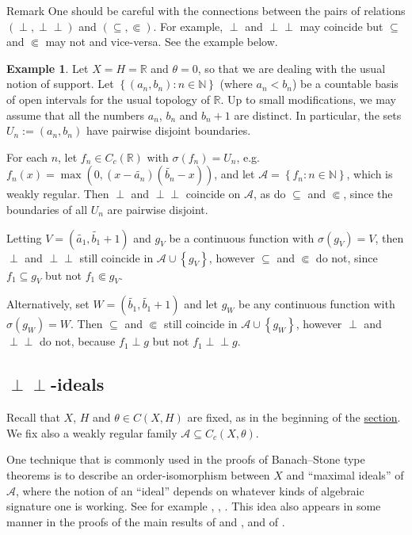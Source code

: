 \documentclass[letter,11pt]{amsart}
\theoremstyle{plain}		\newtheorem{theorem}[generalnumbering]{Theorem}
\theoremstyle{plain}		\newtheorem{corollary}[generalnumbering]{Corollary}
\theoremstyle{definition}		\newtheorem{definition}[generalnumbering]{Definition}
\theoremstyle{definition}		\newtheorem{example}[generalnumbering]{Example}
\theoremstyle{plain}		\newtheorem{proposition}[generalnumbering]{Proposition}
\theoremstyle{plain}		\newtheorem{lemma}[generalnumbering]{Lemma}
\theoremstyle{plain}    \newtheorem{plainstyle}[generalnumbering]{\namefordifferentenvironment}
\theoremstyle{plain}    \newtheorem*{plainstyle*}{\namefordifferentenvironment}
\theoremstyle{definition}    \newtheorem{definitionstyle}[generalnumbering]{\namefordifferentenvironment}
\theoremstyle{definition}    \newtheorem*{definitionstyle*}{\namefordifferentenvironment}
\newcommand{\namefordifferentenvironment}{}
\newenvironment{denv*}[1]{\renewcommand{\namefordifferentenvironment}{#1}\begin{definitionstyle*}}{\end{definitionstyle*}}
\newcommand{\perpp}{\perp\!\!\!\perp}
\begin{document}
\begin{denv*}{Remark}
	One should be careful with the connections between the pairs of relations $(\perp,\perpp)$ and $(\subseteq,\Subset)$. For example, $\perp$ and $\perpp$ may coincide but $\subseteq$ and $\Subset$ may not and vice-versa. See the example below.
\end{denv*}

\begin{example}
	Let $X=H=\mathbb{R}$ and $\theta=0$, so that we are dealing with the usual notion of support. Let $\left\{(a_n,b_n):n\in\mathbb{N}\right\}$ (where $a_n<b_n$) be a countable basis of open intervals for the usual topology of $\mathbb{R}$. Up to small modifications, we may assume that all the numbers $a_n$, $b_n$ and $b_n+1$ are distinct. In particular, the sets $U_n:=(a_n,b_n)$ have pairwise disjoint boundaries.
	
	For each $n$, let $f_n\in C_c(\mathbb{R})$ with $\sigma(f_n)=U_n$, e.g. $f_n(x)=\max(0,(x-\widetilde{a_n})(\widetilde{b_n}-x))$,
	and let $\mathcal{A}=\left\{f_n:n\in\mathbb{N}\right\}$, which is weakly regular. Then $\perp$ and $\perpp$ coincide on $\mathcal{A}$, as do $\subseteq$ and $\Subset$, since the boundaries of all $U_n$ are pairwise disjoint.
	
	Letting $V=(\widetilde{a_1},\widetilde{b_1}+1)$ and $g_V$ be a continuous function with $\sigma(g_V)=V$, then $\perp$ and $\perpp$ still coincide in $\mathcal{A}\cup\left\{g_V\right\}$, however $\subseteq$ and $\Subset$ do not, since $f_1\subseteq g_V$ but not $f_1\Subset g_V$.
	
	Alternatively, set $W=(\widetilde{b_1},\widetilde{b_1}+1)$ and let $g_W$ be any continuous function with $\sigma(g_W)=W$. Then $\subseteq$ and $\Subset$ still coincide in $\mathcal{A}\cup\left\{g_W\right\}$, however $\perp$ and $\perpp$ do not, because $f_1\perp g$ but not $f_1\perpp g$.
\end{example}

\subsection{\texorpdfstring{$\perpp$}{⊥⊥}-ideals}

Recall that $X$, $H$ and $\theta\in C(X,H)$ are fixed, as in the beginning of the \hyperref[sectiondisjointness]{section}. We fix also a weakly regular family $\mathcal{A}\subseteq C_c(X,\theta)$.

One technique that is commonly used in the proofs of Banach--Stone type theorems is to describe an order-isomorphism between $X$ and ``maximal ideals'' of $\mathcal{A}$, where the notion of an ``ideal'' depends on whatever kinds of algebraic signature one is working. See for example \cite[Lemma 2.2]{MR0029476}, \cite[Proposition 2.7]{MR2324919}, \cite[Lemma 3]{MR0020715}. This idea also appears in some manner in the proofs of the main results of \cite{MR3162258} and \cite{MR1060366}, and of \cite[p. 170, Théorème 3]{MR1357166}.
\end{document}
